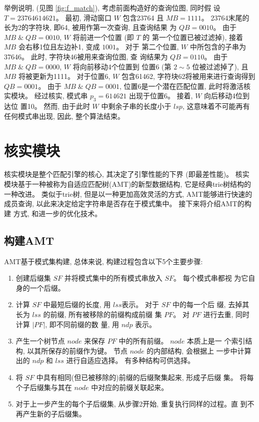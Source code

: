 举例说明, (见图 \ref{fig:f_match}), 考虑前面构造好的查询位图, 同时假
设 $T=23764614621$。  最初, 滑动窗口 $W$ 包含23764 且 $MB = 1111$。
23764末尾的长为2的字符块, 即64, 被用作第一次查询, 且查询结果
为 $QB=0010$。 由于 $MB\; \&\; QB = 0010$, $W$ 将前进一个位置 (即 $T$ 的
第一个位置已被过滤掉), 接着 $MB$ 会右移1位且左边补1, 变成 $1001$。 对于
第二个位置, $W$ 中所包含的子串为37646。 此时, 字符块46被用来查询位图, 查
询结果为 $QB=0110$。 由于 $MB\; \& \; QB=0000$, $W$ 将向前移动4个位置到
位置6 (第 $2 \sim 5$ 位被过滤掉了), 且 $MB$ 将被更新为1111。 对于位置6,
$W$ 包含61462, 字符块62将被用来进行查询得到 $QB = 0001$。 由于 $MB\; \&
\; QB = 0001$, 位置6是一个潜在匹配位置, 此时将激活核实模块。 经过核实,
模式串 $p_3=614621$ 出现于位置6。 接着, $W$ 向后移动4位到达位
置10。 然而, 由于此时 $W$ 中剩余子串的长度小于 $lsp$, 这意味着不可能再有
任何模式串出现, 因此, 整个算法结束。

\section{核实模块}
\label{sec:verification}

核实模块是整个匹配引擎的核心, 其决定了引擎性能的下界 (即最差性能)。 核实
模块基于一种被称为自适应匹配树(AMT)的新型数据结构, 它是经典trie树结构的
一种改进。 类似于trie树, 但是以一种更加高效灵活的方式, AMT能够进行快速的
成员查询, 以此来决定给定字符串是否存在于模式集中。 接下来将介绍AMT的构建
方式, 和进一步的优化技术。

\subsection{构建AMT}
\label{subsec:amt}

AMT基于模式集构建, 总体来说, 构建过程包含以下5个主要步骤:

\begin{enumerate}
\item 创建后缀集 $SF$ 并将模式集中的所有模式串放入 $SF$。 每个模式串都视
  为它自身的一个后缀。
\item 计算 $SF$ 中最短后缀的长度, 用 $lss$表示。 对于 $SF$ 中的每一个后
  缀, 去掉其长为 $lss$ 的前缀, 所有被移除的前缀构成前缀
  集 $PF$。 对 $PF$ 进行去重, 同时计算 $|PF|$, 即不同前缀的数
  量, 用 $ndp$ 表示。
\item 产生一个树节点 $node$ 来保存 $PF$ 中的所有前缀。 $node$ 本质上是一
  个索引结构, 以其所保存的前缀作为键。 节点 $node$ 的内部结构, 会根据上
  一步中计算出的 $ndp$ 和 $lss$ 进行自适应选择。 有多种结构可供选择。
\item 将 $SF$ 中具有相同(但已被移除的)前缀的后缀聚集起来, 形成子后缀
  集。 将每个子后缀集与其在 $node$ 中对应的前缀关联起来。
\item 对于上一步产生的每个子后缀集, 从步骤2开始, 重复执行同样的过程。直
  到不再产生新的子后缀集。
\end{enumerate}

